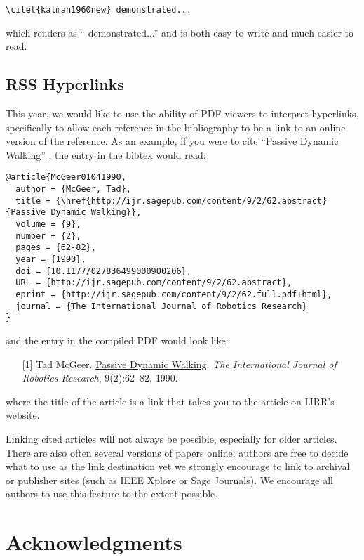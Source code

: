 \documentclass[conference]{IEEEtran}
\begin{document}
{\small
\begin{verbatim}
\citet{kalman1960new} demonstrated... 
\end{verbatim}
}
\noindent
which renders as ``\citet{kalman1960new} demonstrated...'' and is 
both easy to write and much easier to read.
  
\subsection{RSS Hyperlinks}

This year, we would like to use the ability of PDF viewers to interpret
hyperlinks, specifically to allow each reference in the bibliography to be a
link to an online version of the reference. 
As an example, if you were to cite ``Passive Dynamic Walking''
\cite{McGeer01041990}, the entry in the bibtex would read:

{\small
\begin{verbatim}
@article{McGeer01041990,
  author = {McGeer, Tad}, 
  title = {\href{http://ijr.sagepub.com/content/9/2/62.abstract}{Passive Dynamic Walking}}, 
  volume = {9}, 
  number = {2}, 
  pages = {62-82}, 
  year = {1990}, 
  doi = {10.1177/027836499000900206}, 
  URL = {http://ijr.sagepub.com/content/9/2/62.abstract}, 
  eprint = {http://ijr.sagepub.com/content/9/2/62.full.pdf+html}, 
  journal = {The International Journal of Robotics Research}
}
\end{verbatim}
}
\noindent
and the entry in the compiled PDF would look like:

\def\tmplabel#1{[#1]}

\begin{enumerate}
\item[\tmplabel{1}] Tad McGeer. \href{http://ijr.sagepub.com/content/9/2/62.abstract}{Passive Dynamic
Walking}. {\em The International Journal of Robotics Research}, 9(2):62--82,
1990.
\end{enumerate}
%
where the title of the article is a link that takes you to the article on IJRR's website. 


Linking cited articles will not always be possible, especially for
older articles. There are also often several versions of papers
online: authors are free to decide what to use as the link destination
yet we strongly encourage to link to archival or publisher sites
(such as IEEE Xplore or Sage Journals).  We encourage all authors to use this feature to
the extent possible.



\section*{Acknowledgments}




\end{document}
